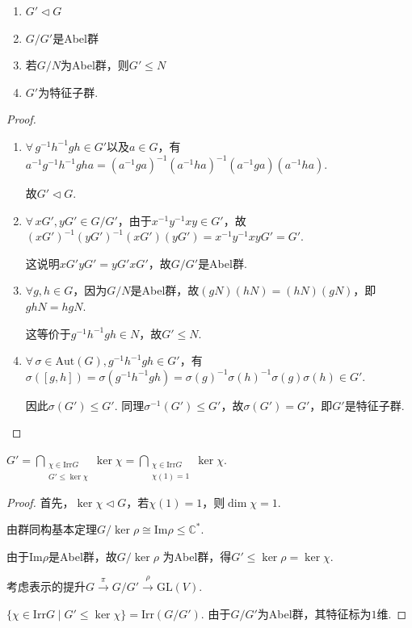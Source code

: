 \begin{property}[]
    \begin{enumerate}
        \item $G' \triangleleft G$
        \item $G/G'$是Abel群
        \item 若$G/N$为Abel群，则$G' \leqslant N$
        \item $G'$为特征子群.
    \end{enumerate}
\end{property}

\begin{proof}
    \begin{enumerate}
        \item $\forall\, g^{-1}h^{-1}gh\in G'$以及$a \in G$，有$a^{-1}g^{-1}h^{-1}gha = (a^{-1}ga)^{-1}(a^{-1}ha)^{-1}(a^{-1}ga)(a^{-1}ha).$\par
        故$G' \triangleleft G$.
        \item $\forall\,xG', yG' \in G/G'$，由于$x^{-1}y^{-1}xy \in G'$，故$(xG')^{-1}(yG')^{-1}(xG')(yG') = x^{-1}y^{-1}xy G' = G'$.\par
        这说明$xG' yG' = yG' xG'$，故$G/G'$是Abel群.
        \item $\forall g,h \in G$，因为$G/N$是Abel群，故$(gN)(hN) = (hN)(gN)$，即$ghN = hgN$.\par
        这等价于$g^{-1}h^{-1}gh \in N$，故$G' \leqslant N$.
        \item $\forall\, \sigma \in \mathrm{Aut}(G),g^{-1}h^{-1}gh \in G'$，有
        $\sigma([g, h]) = \sigma(g^{-1}h^{-1}gh) = \sigma(g)^{-1}\sigma(h)^{-1}\sigma(g)\sigma(h) \in G'$.\par
        因此$\sigma(G') \leqslant G'$. 同理$\sigma^{-1}(G') \leqslant G'$，故$\sigma(G') = G'$，即$G'$是特征子群.\qedhere
    \end{enumerate}
\end{proof}

\begin{theorem}[]
    $G' = \bigcap_{\substack{\chi \in \mathrm{Irr} G\\ G' \leqslant \ker \chi}} \ker \chi = \bigcap_{\substack{\chi \in \mathrm{Irr} G \\ \chi(1)=1}} \ker \chi$.
\end{theorem}

\begin{proof}
    \fbox{$\subseteq$}首先，$\ker \chi \triangleleft G$，若$\chi(1)=1$，则$\dim \chi = 1$.\par
    由群同构基本定理$G/\ker \rho \cong \mathrm{Im} \rho \leqslant \mathbb{C}^*$.\par
    由于$\mathrm{Im} \rho$是Abel群，故$G/\ker \rho$ 为Abel群，得$G' \leqslant \ker \rho = \ker \chi$.\par
    \fbox{$\supseteq$} 考虑表示的提升$G \xrightarrow{\pi} G/G' \xrightarrow{\rho} \mathrm{GL}(V)$.\par
    $\{\chi \in \mathrm{Irr} G \mid G' \leqslant \ker \chi\} = \mathrm{Irr}(G/G')$.
    由于$G/G'$为Abel群，其特征标为$1$维.
\end{proof}

